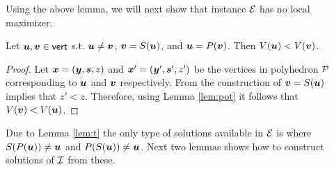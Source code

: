 Using the above lemma, we will next show that instance $\CE$ has no local maximizer. 

\begin{lemma}\label{lem:t}
Let $\uu,\vv \in \vert$ s.t. $\uu\neq \vv$, $\vv=S(\uu)$, and $\uu=P(\vv)$. Then $\pot(\uu)< \pot(\vv)$.
\end{lemma}
\begin{proof}
Let $\xx=(\yy,\ps,z)$ and $\xx'=(\yy',\ps',z')$ be the vertices in polyhedron $\CPol$ corresponding to $\uu$ and $\vv$ respectively. From the construction of $\vv=S(\uu)$ implies that $z'<z$. Therefore, using Lemma \ref{lem:pot} it follows that $\pot(\vv)<\pot(\uu)$.
\end{proof}

Due to Lemma \ref{lem:t} the only type of solutions available in $\CE$ is where $S(P(\uu))\neq \uu$ and $P(S(\uu))\neq \uu$. Next two lemmas shows how to construct solutions of $\CI$ from these. 

